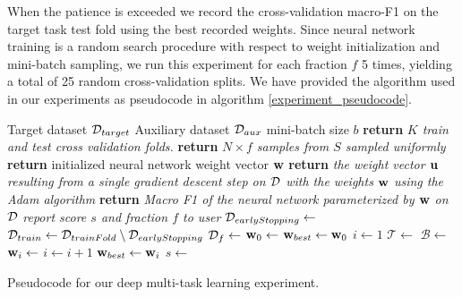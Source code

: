 When the patience is exceeded we record the cross-validation macro-F1 on the target task test fold using the best recorded weights. Since neural network training is a random search procedure with respect to weight initialization and mini-batch sampling, we run this experiment for each fraction $f$ 5 times, yielding a total of 25 random cross-validation splits. We have provided the algorithm used in our experiments as pseudocode in algorithm \ref{experiment_pseudocode}.
\begin{algorithm}
\begin{algorithmic}
	\Require Target dataset $\mathcal{D}_{target}$
	\Require Auxiliary dataset $\mathcal{D}_{aux}$
	\Require mini-batch size $b$
		\State \textbf{return} \textit{$K$ train and test cross validation folds.}
	\EndFunction
		\State \textbf{return} \textit{$N \times f$ samples from $S$ sampled uniformly}
	\EndFunction
		\State \textbf{return} initialized neural network weight vector $\mathbf{w}$
	\EndFunction
		\State \textbf{return} \textit{the weight vector $\mathbf{u}$ resulting from a single gradient descent step on $\mathcal{D}$ with the weights $\mathbf{w}$ using the Adam algorithm}
	\EndFunction
		\State \textbf{return} \textit{Macro F1 of the neural network parameterized by $\mathbf{w}$ on $\mathcal{D}$}
	\EndFunction
		\State \textit{report score $s$ and fraction $f$ to user}
	\EndFunction
				\State $\mathcal{D}_{earlyStopping} \gets$ 
				\State $\mathcal{D}_{train} \gets \mathcal{D}_{trainFold} \setminus \mathcal{D}_{earlyStopping}$
				\State $\mathcal{D}_{f} \gets $ 
				\State $\mathbf{w}_0 \gets$ 
				\State $\mathbf{w}_{best} \gets \mathbf{w}_0$
				\State $i \gets 1$
					\State $\mathcal{T} \gets$ 
					\State $\mathcal{B} \gets$ 
					\State $\mathbf{w}_i \gets$ 
					\State $i \gets i + 1$
						\State $\mathbf{w}_{best} \gets \mathbf{w}_i$
					\EndIf
				\EndWhile
				\State $s \gets$ 
				\State {}
			\EndFor
		\EndFor
	\EndFor
\end{algorithmic}
\caption{Pseudocode for our deep multi-task learning experiment.}
\label{experiment_pseudocode}
\end{algorithm}
